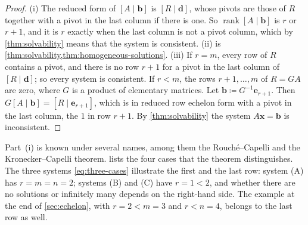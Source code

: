 \begin{proof}
(i) The reduced form of $[A\mid\mathbf b]$ is $[R\mid\mathbf d]$, whose pivots are those of $R$ together with a pivot in the last column if there is one. So $\operatorname{rank}[A\mid\mathbf b]$ is $r$ or $r+1$, and it is $r$ exactly when the last column is not a pivot column, which by \cref{thm:solvability} means that the system is consistent. (ii) is \cref{thm:solvability,thm:homogeneous-solutions}. (iii) If $r=m$, every row of $R$ contains a pivot, and there is no row $r+1$ for a pivot in the last column of $[R\mid\mathbf d]$; so every system is consistent. If $r<m$, the rows $r+1,\ldots,m$ of $R=GA$ are zero, where $G$ is a product of elementary matrices. Let $\mathbf b\coloneqq G^{-1}\mathbf e_{r+1}$. Then $G[A\mid\mathbf b]=[R\mid\mathbf e_{r+1}]$, which is in reduced row echelon form with a pivot in the last column, the $1$ in row $r+1$. By \cref{thm:solvability} the system $A\mathbf x=\mathbf b$ is inconsistent.
\end{proof}

Part~(i) is known under several names, among them the Rouch\'e--Capelli and the Kronecker--Capelli theorem.  lists the four cases that the theorem distinguishes. The three systems \eqref{eq:three-cases} illustrate the first and the last row: system (A) has $r=m=n=2$; systems (B) and (C) have $r=1<2$, and whether there are no solutions or infinitely many depends on the right-hand side. The example at the end of \cref{sec:echelon}, with $r=2<m=3$ and $r<n=4$, belongs to the last row as well.

\begin{table}
\end{table}

